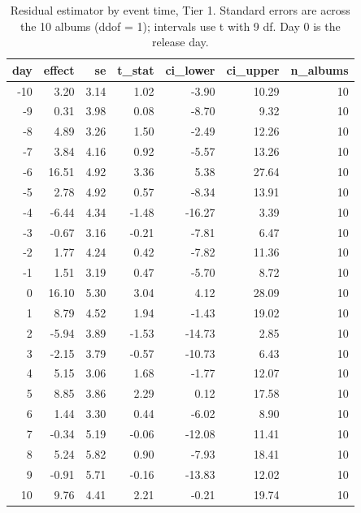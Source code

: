 \begin{table}
\caption{Residual estimator by event time, Tier 1. Standard errors are across the 10 albums (ddof = 1); intervals use t with 9 df. Day 0 is the release day.}
\begin{tabular}{rrrrrrr}
\toprule
day & effect & se & t\_stat & ci\_lower & ci\_upper & n\_albums \\
\midrule
-10 & 3.20 & 3.14 & 1.02 & -3.90 & 10.29 & 10 \\
-9 & 0.31 & 3.98 & 0.08 & -8.70 & 9.32 & 10 \\
-8 & 4.89 & 3.26 & 1.50 & -2.49 & 12.26 & 10 \\
-7 & 3.84 & 4.16 & 0.92 & -5.57 & 13.26 & 10 \\
-6 & 16.51 & 4.92 & 3.36 & 5.38 & 27.64 & 10 \\
-5 & 2.78 & 4.92 & 0.57 & -8.34 & 13.91 & 10 \\
-4 & -6.44 & 4.34 & -1.48 & -16.27 & 3.39 & 10 \\
-3 & -0.67 & 3.16 & -0.21 & -7.81 & 6.47 & 10 \\
-2 & 1.77 & 4.24 & 0.42 & -7.82 & 11.36 & 10 \\
-1 & 1.51 & 3.19 & 0.47 & -5.70 & 8.72 & 10 \\
0 & 16.10 & 5.30 & 3.04 & 4.12 & 28.09 & 10 \\
1 & 8.79 & 4.52 & 1.94 & -1.43 & 19.02 & 10 \\
2 & -5.94 & 3.89 & -1.53 & -14.73 & 2.85 & 10 \\
3 & -2.15 & 3.79 & -0.57 & -10.73 & 6.43 & 10 \\
4 & 5.15 & 3.06 & 1.68 & -1.77 & 12.07 & 10 \\
5 & 8.85 & 3.86 & 2.29 & 0.12 & 17.58 & 10 \\
6 & 1.44 & 3.30 & 0.44 & -6.02 & 8.90 & 10 \\
7 & -0.34 & 5.19 & -0.06 & -12.08 & 11.41 & 10 \\
8 & 5.24 & 5.82 & 0.90 & -7.93 & 18.41 & 10 \\
9 & -0.91 & 5.71 & -0.16 & -13.83 & 12.02 & 10 \\
10 & 9.76 & 4.41 & 2.21 & -0.21 & 19.74 & 10 \\
\bottomrule
\end{tabular}
\end{table}
